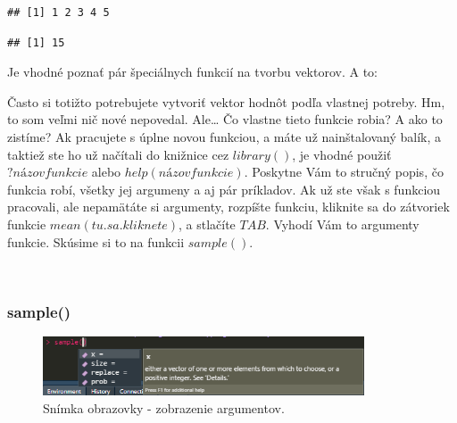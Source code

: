 \begin{verbatim}
## [1] 1 2 3 4 5
\end{verbatim}

\begin{Shaded}
\begin{Highlighting}[]
\end{Highlighting}
\end{Shaded}

\begin{verbatim}
## [1] 15
\end{verbatim}

Je vhodné poznať pár špeciálnych funkcií na tvorbu vektorov. A to:

\begin{Shaded}
\begin{Highlighting}[]
\end{Highlighting}
\end{Shaded}

Často si totižto potrebujete vytvoriť vektor hodnôt podľa vlastnej
potreby. Hm, to som veľmi nič nové nepovedal. Ale\ldots{} Čo vlastne
tieto funkcie robia? A ako to zistíme? Ak pracujete s úplne novou
funkciou, a máte už nainštalovaný balík, a taktiež ste ho už načítali do
knižnice cez \(library()\), je vhodné použiť \(?názovfunkcie\) alebo
\(help(názovfunkcie)\). Poskytne Vám to stručný popis, čo funkcia robí,
všetky jej argumeny a aj pár príkladov. Ak už ste však s funkciou
pracovali, ale nepamätáte si argumenty, rozpíšte funkciu, kliknite sa do
zátvoriek funkcie \(mean(tu.sa.kliknete)\), a stlačíte \(TAB\). Vyhodí
Vám to argumenty funkcie. Skúsime si to na funkcii \(sample()\).

~

\hypertarget{sample}{%
\subsubsection{sample()}\label{sample}}

\begin{figure}
\begin{center}
\includegraphics[width=0.85\textwidth,height=\textheight]{diplomka obrazky/2.png}
\caption{Snímka obrazovky - zobrazenie argumentov.}

\end{center}
\end{figure}
~


